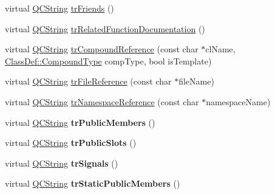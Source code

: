 \begin{DoxyCompactItemize}
\item 
virtual \mbox{\hyperlink{class_q_c_string}{Q\+C\+String}} \mbox{\hyperlink{class_translator_japanese_a92fb4864a83ece67254ab57745316676}{tr\+Friends}} ()
\item 
virtual \mbox{\hyperlink{class_q_c_string}{Q\+C\+String}} \mbox{\hyperlink{class_translator_japanese_a4f76f007a15be60b0141e5892495baaf}{tr\+Related\+Function\+Documentation}} ()
\item 
virtual \mbox{\hyperlink{class_q_c_string}{Q\+C\+String}} \mbox{\hyperlink{class_translator_japanese_a49fe8e71559f8faea8e38ac93de3c06b}{tr\+Compound\+Reference}} (const char $\ast$cl\+Name, \mbox{\hyperlink{class_class_def_ae70cf86d35fe954a94c566fbcfc87939}{Class\+Def\+::\+Compound\+Type}} comp\+Type, bool is\+Template)
\item 
virtual \mbox{\hyperlink{class_q_c_string}{Q\+C\+String}} \mbox{\hyperlink{class_translator_japanese_af0c237ac54e165970832733449e8a15c}{tr\+File\+Reference}} (const char $\ast$file\+Name)
\item 
virtual \mbox{\hyperlink{class_q_c_string}{Q\+C\+String}} \mbox{\hyperlink{class_translator_japanese_ae7a1df4f20d47fc74cd3531309f6ac2a}{tr\+Namespace\+Reference}} (const char $\ast$namespace\+Name)
\item 
\mbox{\label{class_translator_japanese_ab721fa5801317d8037757f1b6582b3bd}} 
virtual \mbox{\hyperlink{class_q_c_string}{Q\+C\+String}} {\bfseries tr\+Public\+Members} ()
\item 
\mbox{\label{class_translator_japanese_a8946ae6c27716ca0501af93656c05b79}} 
virtual \mbox{\hyperlink{class_q_c_string}{Q\+C\+String}} {\bfseries tr\+Public\+Slots} ()
\item 
\mbox{\label{class_translator_japanese_a64b15c69a852bcdac53a1bf2e4a709eb}} 
virtual \mbox{\hyperlink{class_q_c_string}{Q\+C\+String}} {\bfseries tr\+Signals} ()
\item 
\mbox{\label{class_translator_japanese_a236750c9b3c9cc84d1d596bf5894fed8}} 
virtual \mbox{\hyperlink{class_q_c_string}{Q\+C\+String}} {\bfseries tr\+Static\+Public\+Members} ()
\item 
\mbox{\label{class_translator_japanese_ad19808a4977c2bfa865ac7be0dced1a8}} 

\end{DoxyCompactItemize}
